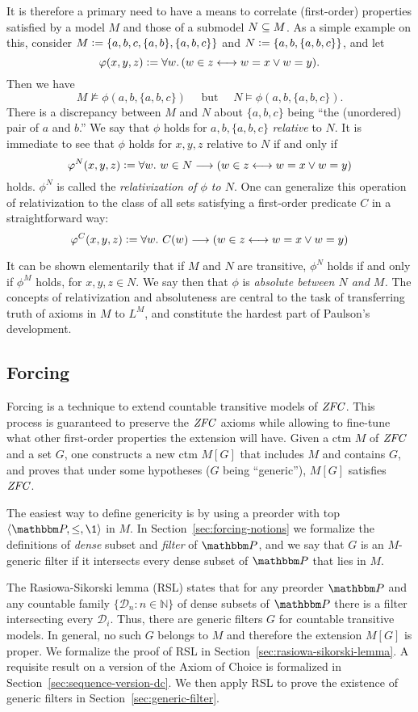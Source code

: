 %
%
%
%
%
%
It is therefore a primary need to have a means to correlate  (first-order)
properties satisfied by a model $M$ and those of a 
submodel $N\subseteq M$. As a simple example on this, consider 
%
%
%
%
%
%
%
%
%
$M\mathrel{\mathop:}= \{a,b,c, \{a,b\},\{a,b,c\}\}$ and
$N\mathrel{\mathop:}=\{a,b,\{a,b,c\}\}$, and let 
\[
\varphi(x,y,z)\mathrel{\mathop:}= \forall w.\,( w\in z \longleftrightarrow w=x \vee w=y).
\]
%
Then we have
\[
M\not\models \phi(a,b,\{a,b,c\}) \quad\text{ but }\quad N\models \phi(a,b,\{a,b,c\}).
\]
There is a discrepancy between  $M$ and $N$ about $\{a,b,c\}$ being ``the
(unordered) pair of $a$ and $b$.'' We say that $\phi$ holds for
$a,b,\{a,b,c\}$ \emph{relative} to $N$. It is immediate to see that
$\phi$ holds  for $x,y,z$ relative to $N$ if and only if
\[
\varphi^N(x,y,z)\mathrel{\mathop:}= \forall w.\ w\in N\longrightarrow ( w\in z \longleftrightarrow w=x \vee w=y)
\] 
holds. $\phi^N$ is called the \emph{relativization of $\phi$ to
  $N$}. One can generalize this operation of relativization to the
class of all sets satisfying a first-order predicate $C$ in a
straightforward way:
\[
\varphi^C(x,y,z)\mathrel{\mathop:}= \forall w.\ C(w)\longrightarrow ( w\in z \longleftrightarrow w=x \vee w=y)
\] 

It can be shown elementarily that if $M$ and $N$ are transitive,
$\phi^N$ holds if and only if $\phi^M$ holds,  for $x,y,z\in N$. We
say then that $\phi$ is \emph{absolute between $N$ and $M$.}
%
%
The concepts of relativization and absoluteness are central to the
task of transferring truth of axioms in $M$ to $L^M$, and constitute
the hardest part of Paulson's development.


\subsection{Forcing}
%
%
%
Forcing is a technique to extend countable transitive models of
$\mathit{ZFC}$. This process is guaranteed to preserve the $\mathit{ZFC}$
axioms while allowing to fine-tune what other first-order properties the
extension will have. Given a ctm $M$  of $\mathit{ZFC}$ and a set $G$, one constructs a new
ctm  $M[G]$  that includes $M$ and
contains $G$, and proves that under some hypotheses ($G$ being ``generic''),
$M[G]$ satisfies $\mathit{ZFC}$.

The easiest way to define genericity is by using a preorder with top
$\lb\PP,\leq,\1\rb$ in $M$.   
In Section~\ref{sec:forcing-notions} we formalize the definitions of
\emph{dense} subset and  \emph{filter} of  $\PP$, and we say that  $G$
is an $M$-generic filter
if it intersects every dense subset of $\PP$ that lies in $M$.

%
%
%
%
%
The Rasiowa-Sikorski lemma (RSL) states that for any preorder $\PP$
and any countable family $\{\mathcal{D}_n : n\in\mathbb{N}\}$ of dense
subsets of $\PP$ there is a filter intersecting every
$\mathcal{D}_i$. Thus, there are generic filters $G$ for countable
transitive models. In general, no such $G$ belongs to $M$ and
therefore the extension $M[G]$ is proper. We formalize the proof of
RSL in Section~\ref{sec:rasiowa-sikorski-lemma}. A requisite result on
a version of the Axiom of Choice is formalized in
Section~\ref{sec:sequence-version-dc}. We then apply RSL to prove the
existence of generic filters in Section~\ref{sec:generic-filter}.

